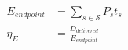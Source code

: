 \documentclass[12pt,border=0pt]{standalone}
\begin{document}
\color[rgb]{0.16,0.17,0.43}
\(
\begin{aligned}
E_{\mathit{endpoint}}
  &= \sum_{s \in \mathcal{S}} P_s t_s \\[0.8em]
\eta_E
  &= \frac{D_{\mathit{delivered}}}{E_{\mathit{endpoint}}}
\end{aligned}
\)
\end{document}
